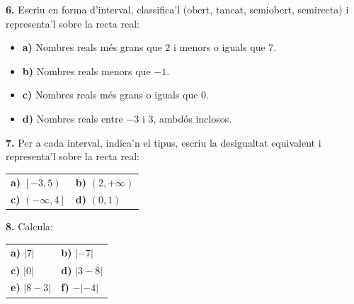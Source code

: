 \documentclass[13pt,a4paper]{extarticle}
\begin{document}
\par\noindent\begin{minipage}{\linewidth}
\textbf{6.} Escriu en forma d'interval, classifica'l (obert, tancat, semiobert, semirecta) i representa'l sobre la recta real:\par

\begin{itemize}[leftmargin=0pt,itemsep=3pt,topsep=3pt,parsep=0pt,label={}]
\item \textbf{a)} Nombres reals més grans que $2$ i menors o iguals que $7$.
\item \textbf{b)} Nombres reals menors que $-1$.
\item \textbf{c)} Nombres reals més grans o iguals que $0$.
\item \textbf{d)} Nombres reals entre $-3$ i $3$, ambdós inclosos.
\end{itemize}
\end{minipage}\par\vspace{1.6mm}
\par\noindent\begin{minipage}{\linewidth}
\textbf{7.} Per a cada interval, indica'n el tipus, escriu la desigualtat equivalent i representa'l sobre la recta real:\par

\begin{tabular}{@{}p{.46\linewidth}p{.46\linewidth}@{}}
\textbf{a)} $\left[-3,5\right)$ & \textbf{b)} $\left(2,+\infty\right)$ \\[2pt]
\textbf{c)} $\left(-\infty,4\right]$ & \textbf{d)} $\left(0,1\right)$ \\[2pt]
\end{tabular}\par
\end{minipage}\par\vspace{1.6mm}
\par\noindent\begin{minipage}{\linewidth}
\textbf{8.} Calcula:\par

\begin{tabular}{@{}p{.46\linewidth}p{.46\linewidth}@{}}
\textbf{a)} $\lvert 7\rvert$ & \textbf{b)} $\lvert -7\rvert$ \\[2pt]
\textbf{c)} $\lvert 0\rvert$ & \textbf{d)} $\lvert 3-8\rvert$ \\[2pt]
\textbf{e)} $\lvert 8-3\rvert$ & \textbf{f)} $-\lvert -4\rvert$ \\[2pt]
\end{tabular}\par
\end{minipage}\par\vspace{1.6mm}
\end{document}
